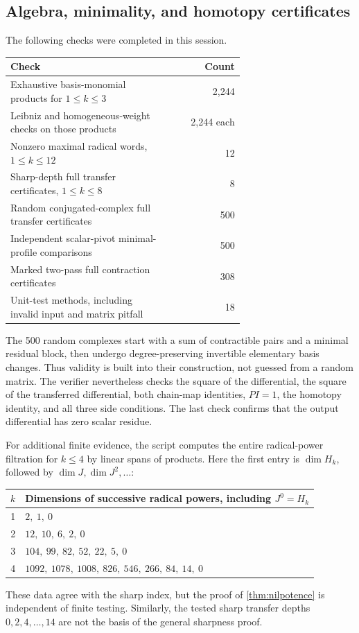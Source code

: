 \documentclass[11pt,letterpaper]{article}
\theoremstyle{definition}
\theoremstyle{remark}
\begin{document}
\subsection{Algebra, minimality, and homotopy certificates}
The following checks were completed in this session.
\begin{center}\small
\begin{tabular}{p{0.67\linewidth}r}
\toprule
Check & Count\\\midrule
Exhaustive basis-monomial products for $1\leq k\leq3$ & 2,244\\
Leibniz and homogeneous-weight checks on those products & 2,244 each\\
Nonzero maximal radical words, $1\leq k\leq12$ & 12\\
Sharp-depth full transfer certificates, $1\leq k\leq8$ & 8\\
Random conjugated-complex full transfer certificates & 500\\
Independent scalar-pivot minimal-profile comparisons & 500\\
Marked two-pass full contraction certificates & 308\\
Unit-test methods, including invalid input and matrix pitfall & 18\\
\bottomrule
\end{tabular}
\end{center}
The 500 random complexes start with a sum of contractible pairs and a minimal
residual block, then undergo degree-preserving invertible elementary basis
changes. Thus validity is built into their construction, not guessed from a
random matrix. The verifier nevertheless checks the square of the differential,
the square of the transferred differential, both chain-map identities, $PI=1$,
the homotopy identity, and all three side conditions. The last check confirms
that the output differential has zero scalar residue.

For additional finite evidence, the script computes the entire radical-power
filtration for $k\leq4$ by linear spans of products. Here the first entry is
$\dim H_k$, followed by $\dim J,\dim J^2,\ldots$:
\begin{center}\small
\begin{tabular}{cl}
\toprule
$k$ & Dimensions of successive radical powers, including $J^0=H_k$\\\midrule
1 & $2,\ 1,\ 0$\\
2 & $12,\ 10,\ 6,\ 2,\ 0$\\
3 & $104,\ 99,\ 82,\ 52,\ 22,\ 5,\ 0$\\
4 & $1092,\ 1078,\ 1008,\ 826,\ 546,\ 266,\ 84,\ 14,\ 0$\\
\bottomrule
\end{tabular}
\end{center}
These data agree with the sharp index, but the proof of
\cref{thm:nilpotence} is independent of finite testing. Similarly, the tested
sharp transfer depths $0,2,4,\ldots,14$ are not the basis of the general
sharpness proof.
\end{document}
